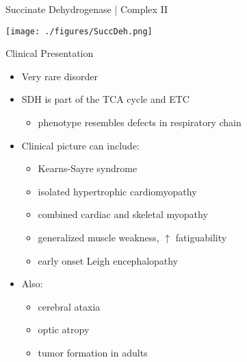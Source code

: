 \documentclass[presentation, smaller]{beamer}
\begin{document}
\begin{frame}[label={sec:org45f99e7}]{Succinate Dehydrogenase | Complex II}
\begin{center}
\texttt{[image: ./figures/SuccDeh.png]}
\end{center}
\end{frame}


\begin{frame}[label={sec:orgbfdf398}]{Clinical Presentation}
\begin{itemize}
\item Very rare disorder
\item SDH is part of the TCA cycle and ETC
\begin{itemize}
\item phenotype resembles defects in respiratory chain
\end{itemize}
\item Clinical picture can include:
\begin{itemize}
\item Kearns-Sayre syndrome
\item isolated hypertrophic cardiomyopathy
\item combined cardiac and skeletal myopathy
\item generalized muscle weakness, \(\uparrow\) fatiguability
\item early onset Leigh encephalopathy
\end{itemize}
\item Also:
\begin{itemize}
\item cerebral ataxia
\item optic atropy
\item tumor formation in adults
\end{itemize}
\end{itemize}
\end{frame}
\end{document}
